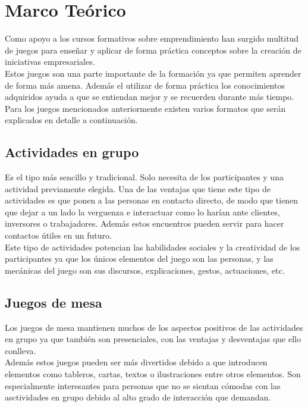 \chapter{Marco Teórico}
\label{marcoteorico}

Como apoyo a los cursos formativos sobre emprendimiento han surgido multitud de juegos para enseñar y aplicar de forma práctica conceptos sobre la creación de iniciativas empresariales.\\
Estos juegos son una parte importante de la formación ya que permiten aprender de forma más amena. Además el utilizar de forma práctica los conocimientos adquiridos ayuda a que se entiendan mejor y se recuerden durante más tiempo.
Para los juegos mencionados anteriormente existen varios formatos que serán explicados en detalle a continuación. 

\section{Actividades en grupo}

Es el tipo más sencillo y tradicional. Solo necesita de los participantes y una actividad previamente elegida. Una de las ventajas que tiene este tipo de actividades es que ponen a las personas en contacto directo, de modo que tienen que dejar a un lado la verguenza e interactuar como lo harían ante clientes, inversores o trabajadores. Además estos encuentros pueden servir para hacer contactos útiles en un futuro.\\
Este tipo de actividades potencian las habilidades sociales y la creatividad de los participantes ya que los únicos elementos del juego son las personas, y las mecánicas del juego son sus discursos, explicaciones, gestos, actuaciones, etc.

\section{Juegos de mesa}

Los juegos de mesa mantienen muchos de los aspectos positivos de las actividades en grupo ya que también son presenciales, con las ventajas y desventajas que ello conlleva.\\
Además estos juegos pueden ser más divertidos debido a que introducen elementos como tableros, cartas, textos o ilustraciones entre otros elementos. Son especialmente interesantes para personas que no se sientan cómodas con las asctividades en grupo debido al alto grado de interacción que demandan.

